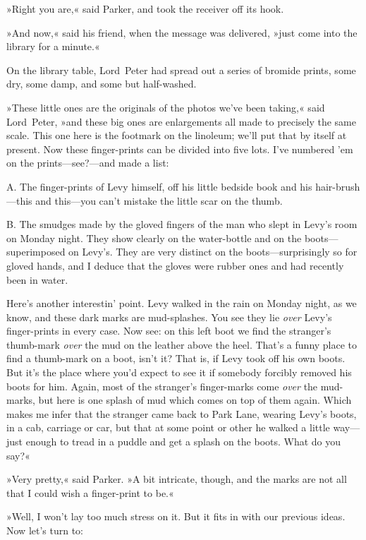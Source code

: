 »Right you are,« said Parker, and took the receiver off its hook.

»And now,« said his friend, when the message was delivered, »just come into the library for a minute.«

On the library table, Lord~Peter had spread out a series of bromide prints, some dry, some damp, and some but half-washed.

»These little ones are the originals of the photos we've been taking,« said Lord~Peter, »and these big ones are enlargements all made to precisely the same scale. This one here is the footmark on the linoleum; we'll put that by itself at present. Now these finger-prints can be divided into five lots. I've numbered 'em on the prints—see?---and made a list:

\textsc{A.} The finger-prints of Levy himself, off his little bedside book and his hair-brush—this and this—you can't mistake the little scar on the thumb.

\textsc{B.} The smudges made by the gloved fingers of the man who slept in Levy's room on Monday night. They show clearly on the water-bottle and on the boots—superimposed on Levy's. They are very distinct on the boots—surprisingly so for gloved hands, and I deduce that the gloves were rubber ones and had recently been in water.

Here's another interestin' point. Levy walked in the rain on Monday night, as we know, and these dark marks are mud-splashes. You see they lie \textit{over} Levy's finger-prints in every case. Now see: on this left boot we find the stranger's thumb-mark \textit{over} the mud on the leather above the heel. That's a funny place to find a thumb-mark on a boot, isn't it? That is, if Levy took off his own boots. But it's the place where you'd expect to see it if somebody forcibly removed his boots for him. Again, most of the stranger's finger-marks come \textit{over} the mud-marks, but here is one splash of mud which comes on top of them again. Which makes me infer that the stranger came back to Park Lane, wearing Levy's boots, in a cab, carriage or car, but that at some point or other he walked a little way—just enough to tread in a puddle and get a splash on the boots. What do you say?«

»Very pretty,« said Parker. »A bit intricate, though, and the marks are not all that I could wish a finger-print to be.«

»Well, I won't lay too much stress on it. But it fits in with our previous ideas. Now let's turn to:

